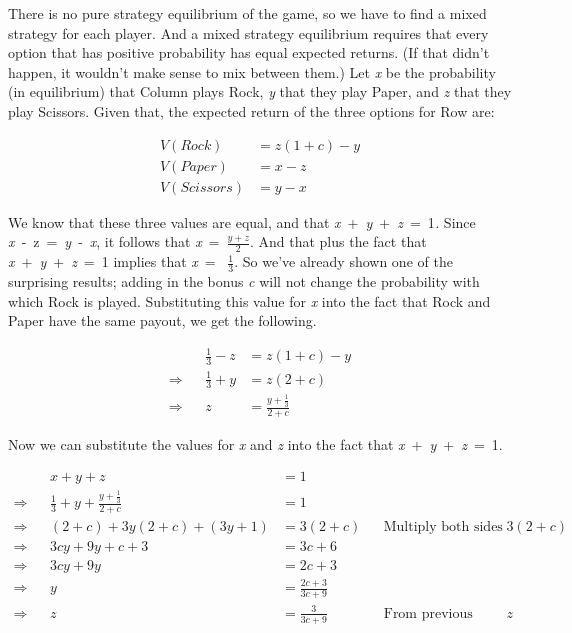 \documentclass[
  12pt,
  letterpaper,
  DIV=11,
  numbers=noendperiod]{scrreprt}
\begin{document}
There is no pure strategy equilibrium of the game, so we have to find a
mixed strategy for each player. And a mixed strategy equilibrium
requires that every option that has positive probability has equal
expected returns. (If that didn't happen, it wouldn't make sense to mix
between them.) Let \emph{x} be the probability (in equilibrium) that
Column plays Rock, \emph{y} that they play Paper, and \emph{z} that they
play Scissors. Given that, the expected return of the three options for
Row are:

\begin{align*}
V(Rock) &= z(1+c) - y \\
V(Paper) &= x - z \\
V(Scissors) &= y - x
\end{align*}

We know that these three values are equal, and that
\emph{x}~+~\emph{y}~+~\emph{z}~=~1\emph{.} Since
\emph{x}~‑~z~=~\emph{y}~‑~\emph{x}, it follows that
\emph{x}~=~\(\frac{y+z}{2}\). And that plus the fact that
\emph{x}~+~\emph{y}~+~\emph{z}~=~1 implies that \emph{x}~=~
\(\frac{1}{3}\). So we've already shown one of the surprising results;
adding in the bonus \emph{c} will not change the probability with which
Rock is played. Substituting this value for \emph{x} into the fact that
Rock and Paper have the same payout, we get the following.

\begin{align*}
&& \frac{1}{3} - z &= z(1+c) - y \\
\Rightarrow && \frac{1}{3} + y &= z(2+c) \\
\Rightarrow && z &= \frac{y + \frac{1}{3}}{2 + c}
\end{align*}

Now we can substitute the values for \emph{x} and \emph{z} into the fact
that \emph{x}~+~\emph{y}~+~\emph{z}~=~1.

\begin{align*}
&& x + y + z &= 1  && \\
\Rightarrow && \frac{1}{3} + y + \frac{y + \frac{1}{3}}{2 + c} &= 1 && \\
\Rightarrow && (2+c) + 3y(2+c) + (3y+1) &= 3(2+c) && \text{Multiply both sides by } 3(2+c) \\
\Rightarrow && 3cy + 9y + c + 3 &= 3c + 6 \\
\Rightarrow && 3cy + 9y &= 2c + 3 \\
\Rightarrow && y &= \frac{2c + 3}{3c + 9} \\
\Rightarrow && z &= \frac{3}{3c + 9} && \text{From previous derivation for }z
\end{align*}
\end{document}
